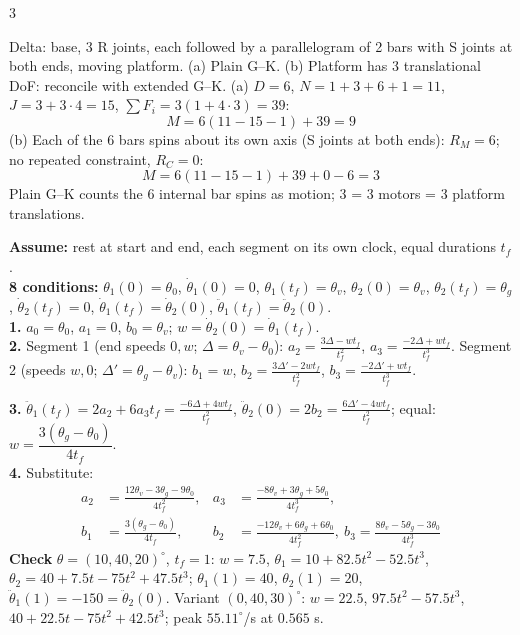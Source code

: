 \begin{multicols}{3}
\begin{examq}
Delta: base, 3 R joints, each followed by a parallelogram of 2 bars with S joints at both ends, moving platform. (a) Plain G--K. (b) Platform has 3 translational DoF: reconcile with extended G--K.
\solution
(a) $D=6$, $N=1+3+6+1=11$, $J=3+3\cdot4=15$, $\sum F_i=3(1+4\cdot3)=39$:
\[M=6(11-15-1)+39=\boxed{9}\]
(b) Each of the 6 bars spins about its own axis (S joints at both ends): $R_M=6$; no repeated constraint, $R_C=0$:
\[M=6(11-15-1)+39+0-6=\boxed{3}\]
Plain G--K counts the 6 internal bar spins as motion; $3$ = 3 motors = 3 platform translations.
\end{examq}
\begin{examq}
\solution
\textbf{Assume:} rest at start and end, each segment on its own clock, equal durations $t_f$.\\
\textbf{8 conditions:} $\theta_1(0)=\theta_0$, $\dot\theta_1(0)=0$, $\theta_1(t_f)=\theta_v$, $\theta_2(0)=\theta_v$, $\theta_2(t_f)=\theta_g$, $\dot\theta_2(t_f)=0$, $\dot\theta_1(t_f)=\dot\theta_2(0)$, $\ddot\theta_1(t_f)=\ddot\theta_2(0)$.\\
\textbf{1.} $a_0=\theta_0$, $a_1=0$, $b_0=\theta_v$; $w=\dot\theta_2(0)=\dot\theta_1(t_f)$.\\
\textbf{2.} Segment 1 (end speeds $0,w$; $\Delta=\theta_v-\theta_0$): $a_2=\frac{3\Delta-wt_f}{t_f^2}$, $a_3=\frac{-2\Delta+wt_f}{t_f^3}$. Segment 2 (speeds $w,0$; $\Delta'=\theta_g-\theta_v$): $b_1=w$, $b_2=\frac{3\Delta'-2wt_f}{t_f^2}$, $b_3=\frac{-2\Delta'+wt_f}{t_f^3}$.\\
\end{examq}
\begin{examq}
\textbf{3.} $\ddot\theta_1(t_f)=2a_2+6a_3t_f=\frac{-6\Delta+4wt_f}{t_f^2}$, $\ddot\theta_2(0)=2b_2=\frac{6\Delta'-4wt_f}{t_f^2}$; equal: $\boxed{w=\dfrac{3(\theta_g-\theta_0)}{4t_f}}$.\\
\textbf{4.} Substitute:
\[\boxed{\begin{aligned}
a_2&=\tfrac{12\theta_v-3\theta_g-9\theta_0}{4t_f^2}, & a_3&=\tfrac{-8\theta_v+3\theta_g+5\theta_0}{4t_f^3},\\
b_1&=\tfrac{3(\theta_g-\theta_0)}{4t_f}, & b_2&=\tfrac{-12\theta_v+6\theta_g+6\theta_0}{4t_f^2},\ b_3=\tfrac{8\theta_v-5\theta_g-3\theta_0}{4t_f^3}\end{aligned}}\]
\textbf{Check} $\theta=(10,40,20)^\circ$, $t_f=1$: $w=7.5$, $\theta_1=10+82.5t^2-52.5t^3$, $\theta_2=40+7.5t-75t^2+47.5t^3$; $\theta_1(1)=40$, $\theta_2(1)=20$, $\ddot\theta_1(1)=-150=\ddot\theta_2(0)$. Variant $(0,40,30)^\circ$: $w=22.5$, $97.5t^2-57.5t^3$, $40+22.5t-75t^2+42.5t^3$; peak $55.11^\circ$/s at $0.565$ s. \chk\\

\end{examq}
\end{multicols}
